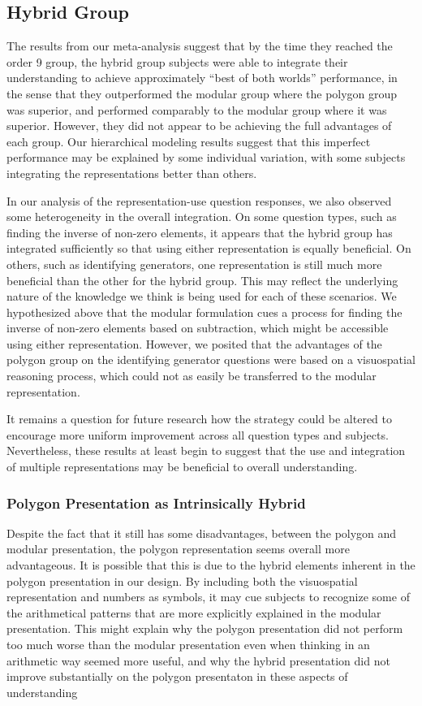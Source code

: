 \documentclass[man,10pt]{apa6}
\begin{document}
\subsection{Hybrid Group}
The results from our meta-analysis suggest that by the time they reached the order 9 group, the hybrid group subjects were able to integrate their understanding to achieve approximately ``best of both worlds'' performance, in the sense that they outperformed the modular group where the polygon group was superior, and performed comparably to the modular group where it was superior. However, they did not appear to be achieving the full advantages of each group. Our hierarchical modeling results suggest that this imperfect performance may be explained by some individual variation, with some subjects integrating the representations better than others. \par 
In our analysis of the representation-use question responses, we also observed some heterogeneity in the overall integration. On some question types, such as finding the inverse of non-zero elements, it appears that the hybrid group has integrated sufficiently so that using either representation is equally beneficial. On others, such as identifying generators, one representation is still much more beneficial than the other for the hybrid group. This may reflect the underlying nature of the knowledge we think is being used for each of these scenarios. We hypothesized above that the modular formulation cues a process for finding the inverse of non-zero elements based on subtraction, which might be accessible using either representation. However, we posited that the advantages of the polygon group on the identifying generator questions were based on a visuospatial reasoning process, which could not as easily be transferred to the modular representation. \par 
It remains a question for future research how the strategy could be altered to encourage more uniform improvement across all question types and subjects. Nevertheless, these results at least begin to suggest that the use and integration of multiple representations may be beneficial to overall understanding. 
\subsubsection{Polygon Presentation as Intrinsically Hybrid}
Despite the fact that it still has some disadvantages, between the polygon and modular presentation, the polygon representation seems overall more advantageous. It is possible that this is due to the hybrid elements inherent in the polygon presentation in our design. By including both the visuospatial representation and numbers as symbols, it may cue subjects to recognize some of the arithmetical patterns that are more explicitly explained in the modular presentation. This might explain why the polygon presentation did not perform too much worse than the modular presentation even when thinking in an arithmetic way seemed more useful, and why the hybrid presentation did not improve substantially on the polygon presentaton in these aspects of understanding 
\end{document}
